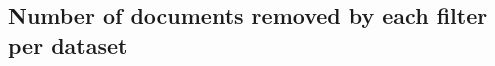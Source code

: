 \documentclass{article}
\begin{document}
\begin{itemize}
\end{itemize}

\subsection{Number of documents removed by each filter per dataset}
\end{document}

